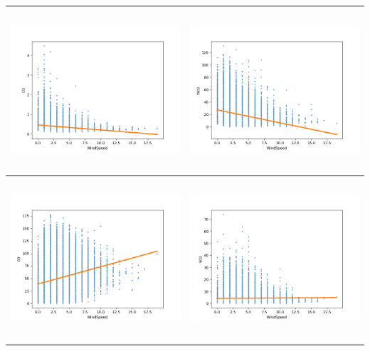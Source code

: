\documentclass[18pt, letterpaper]{article}
\begin{document}
\begin{table}[H]
\centering
\begin{tabular}{|c|c|}
\hline
\includegraphics[width=80mm,height=60mm]{visualisations/corr_plots/WindSpeedxCO_scatter.png}  & \includegraphics[width=80mm,height=60mm]{visualisations/corr_plots/WindSpeedxNO2_scatter.png} \\ \hline
\includegraphics[width=80mm,height=60mm]{visualisations/corr_plots/WindSpeedxO3_scatter.png}  & \includegraphics[width=80mm,height=60mm]{visualisations/corr_plots/WindSpeedxSO2_scatter.png} \\ \hline

\end{tabular}
\end{table}
\end{document}
